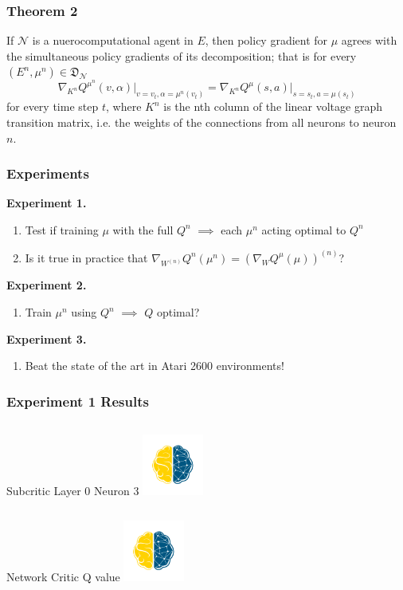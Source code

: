 \documentclass{beamer}
\numberwithin{equation}{subsection}
\numberwithin{theorem}{subsection}
\def\scriptn{{\mathcal N}}
\begin{document}
\begin{frame}
    \frametitle{Theorem 2}
    \begin{theorem}
        If $\scriptn$ is a nuerocomputational agent in $E$, then policy gradient for $\mu$ agrees with the simultaneous policy gradients of its decomposition; that is for every $(E^n, \mu^n) \in \mathfrak{D}_\scriptn$
        \begin{equation}
            \nabla_{K^n} Q^{\mu^n}(v,\alpha)\Big|_{v=v_t,\alpha=\mu^n(v_t)} =\nabla_{K^n} Q^{\mu}(s,a)\Big|_{s=s_t,a=\mu(s_t)}
        \end{equation}
        for every time step $t$, where $K^n$ is the nth column of the linear voltage graph transition matrix, i.e. the weights of the connections from all neurons to neuron $n.$
    \end{theorem}
\end{frame}
\begin{frame}
  \frametitle{Experiments}
  \textbf{Experiment 1.}
  \begin{enumerate}
    \item Test if training $\mu$ with the full $Q^n$ $\implies$ each $\mu^n$ acting optimal to $Q^n$
    \item Is it true in practice that $\nabla_{W^{(n)}} Q^{n}(\mu^n) = \left(\nabla_{W} Q^\mu(\mu)\right)^{(n)}$?
  \end{enumerate}
    \textbf{Experiment 2.}
    \begin{enumerate}
      \item Train $\mu^n$ using $Q^n$ $\implies$ $Q$ optimal?
    \end{enumerate}
        \textbf{Experiment 3.}
    \begin{enumerate}
      \item Beat the state of the art in Atari 2600 environments!
    \end{enumerate}
\end{frame}
\begin{frame}
    \frametitle{Experiment 1 Results}
    \begin{column}{0.5\textwidth}
        Subcritic Layer 0 Neuron 3
        \includegraphics[height=2cm,width=2cm]{BlueGold_fill_small.png}
    \end{column}
    \begin{column}{0.5\textwidth}
        Network Critic Q value
        \includegraphics[height=2cm,width=2cm]{BlueGold_fill_small.png}
    \end{column}
\end{frame}
\end{document}
